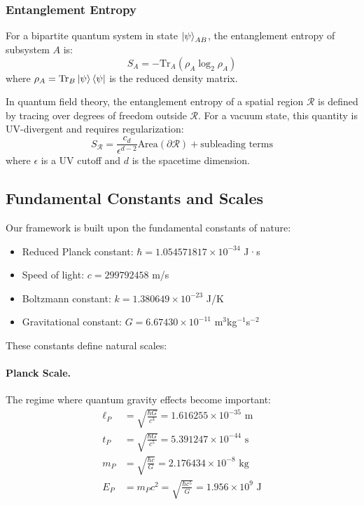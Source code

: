 \documentclass[11pt,a4paper]{article}
\theoremstyle{plain}
\theoremstyle{definition}
\theoremstyle{remark}
\begin{document}
\subsubsection{Entanglement Entropy}

For a bipartite quantum system in state $\ket{\psi}_{AB}$, the entanglement entropy of subsystem $A$ is:
\begin{equation}
S_A = -\text{Tr}_A(\rho_A\log_2\rho_A)
\end{equation}
where $\rho_A = \text{Tr}_B\ket{\psi}\bra{\psi}$ is the reduced density matrix.

In quantum field theory, the entanglement entropy of a spatial region $\mathcal{R}$ is defined by tracing over degrees of freedom outside $\mathcal{R}$. For a vacuum state, this quantity is UV-divergent and requires regularization:
\begin{equation}
S_{\mathcal{R}} = \frac{c_d}{\epsilon^{d-2}}\text{Area}(\partial\mathcal{R}) + \text{subleading terms}
\end{equation}
where $\epsilon$ is a UV cutoff and $d$ is the spacetime dimension.

\subsection{Fundamental Constants and Scales}

Our framework is built upon the fundamental constants of nature:

\begin{itemize}[leftmargin=*]
\item Reduced Planck constant: $\hbar = 1.054571817\times 10^{-34}$ J·s
\item Speed of light: $c = 299792458$ m/s
\item Boltzmann constant: $k = 1.380649\times 10^{-23}$ J/K
\item Gravitational constant: $G = 6.67430\times 10^{-11}$ m$^3$kg$^{-1}$s$^{-2}$
\end{itemize}

These constants define natural scales:

\paragraph{Planck Scale.} The regime where quantum gravity effects become important:
\begin{align}
\ell_P &= \sqrt{\frac{\hbar G}{c^3}} = 1.616255\times 10^{-35}\text{ m} \\
t_P &= \sqrt{\frac{\hbar G}{c^5}} = 5.391247\times 10^{-44}\text{ s} \\
m_P &= \sqrt{\frac{\hbar c}{G}} = 2.176434\times 10^{-8}\text{ kg} \\
E_P &= m_P c^2 = \sqrt{\frac{\hbar c^5}{G}} = 1.956\times 10^9\text{ J}
\end{align}
\end{document}
